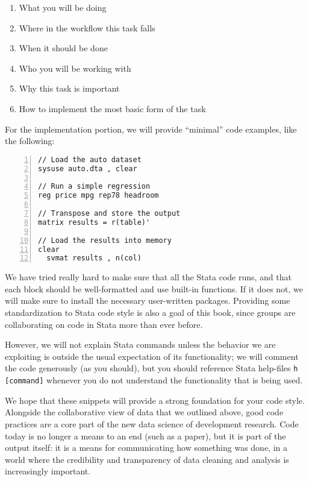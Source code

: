 \begin{enumerate}
  \item What you will be doing
  \item Where in the workflow this task falls
  \item When it should be done
  \item Who you will be working with
  \item Why this task is important
  \item How to implement the most basic form of the task
\end{enumerate}

For the implementation portion, we will provide ``minimal'' code examples, like the following:


\begin{Verbatim}[frame=lines,numbers=left,label=code.do]
// Load the auto dataset
sysuse auto.dta , clear

// Run a simple regression
reg price mpg rep78 headroom

// Transpose and store the output
matrix results = r(table)'

// Load the results into memory
clear
  svmat results , n(col)
\end{Verbatim}

We have tried really hard to make sure that all the Stata code runs,
and that each block should be well-formatted and use built-in functions.
If it does not, we will make sure to install the necessary user-written packages.
Providing some standardization to Stata code style is also a goal of this book,
since groups are collaborating on code in Stata more than ever before.

However, we will not explain Stata commands unless the behavior we are exploiting
is outside the usual expectation of its functionality;
we will comment the code generously (as you should),
but you should reference Stata help-files \texttt{h [command]}
whenever you do not understand the functionality that is being used.

We hope that these snippets will provide a strong foundation for your code style.
Alongside the collaborative view of data that we outlined above,
good code practices are a core part of the new data science of development research.
Code today is no longer a means to an end (such as a paper),
but it is part of the output itself: it is a means for communicating how something was done,
in a world where the credibility and transparency of data cleaning and analysis is increasingly important.

